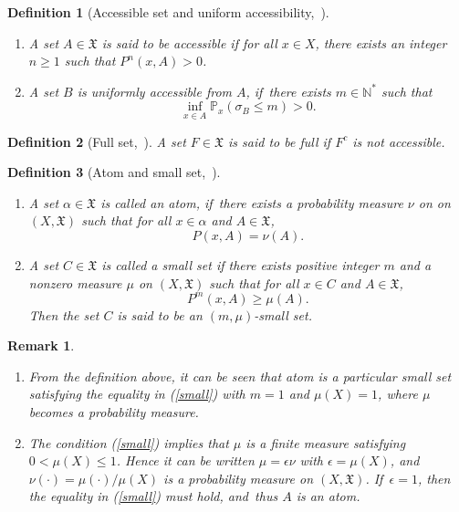 \documentclass[11pt]{elsarticle}
\newtheorem{definition}{Definition}[section]
\newtheorem{remark}{Remark}[section]
\def\geq{\geqslant}
\def\leq{\leqslant}
\def\P{\mathbb{P}}
\def\N{\mathbb{N}}
\begin{document}
\begin{definition}[Accessible set and uniform accessibility,~\cite{DMPS18}]
	\begin{enumerate}
		\item [(1)] \label{accessible} A set $A\in\mathfrak{X}$ is said to be   accessible  if for all $x\in X$, there exists an integer $n\geq1$ such that $P^n(x,A)>0$.
		\item[(2)]\label{def-uniformaccess} A set $B$ is   uniformly accessible from $A$, if~there exists $m\in\N^*$ such that
		$$\inf_{x\in A}\P_x(\sigma_B\leq m)>0.$$
	\end{enumerate}
\end{definition}
\begin{definition}[Full set,~\cite{DMPS18}]
	A set $F\in\mathfrak{X}$ is said to be  full if $F^c$ is not accessible.
\end{definition}
\begin{definition}[Atom and small set,~\cite{DMPS18}]\label{smallset}
	\begin{enumerate}
		\item[(1)] A set $\alpha\in\mathfrak{X}$ is called an  atom, if~there exists a probability measure $\nu$ on on $(X,\mathfrak{X})$ such that for all $x\in \alpha$ and $A\in \mathfrak{X}$,
		$$P(x,A)=\nu(A).$$
		\item[(2)] A set $C\in\mathfrak{X}$ is called a  small set if there exists positive integer $m$ and a nonzero measure $\mu$ on $(X,\mathfrak{X})$ such that for all $x\in C$ and $A\in \mathfrak{X}$,
		\begin{equation}\label{small}
			P^m(x,A)\geq\mu(A).
		\end{equation}
		Then the set $C$ is said to be an  $(m,\mu)$-small set.
	\end{enumerate}
\end{definition}
\begin{remark}\label{remark}
	\begin{enumerate}
		\item[(1)] From the definition above, it can be seen that atom is a particular small set satisfying the equality in (\ref{small}) with $m=1$ and $\mu(X)=1$, where $\mu$ becomes a probability measure.
		\item[(2)] The condition (\ref{small}) implies that $\mu$ is a finite measure satisfying $0<\mu(X)\leq1$. Hence it can be written $\mu=\epsilon\nu$ with $\epsilon=\mu(X)$, and~$\nu(\cdot)=\mu(\cdot)/\mu(X)$ is a probability measure on $(X,\mathfrak{X})$. If~$\epsilon=1$, then the equality in (\ref{small}) must hold, and~thus $A$ is an atom. 
	\end{enumerate}
\end{remark}
\end{document}
